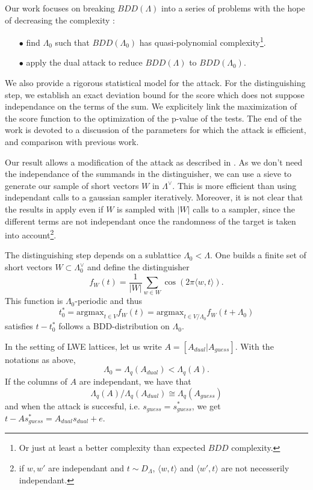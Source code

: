 \documentclass{article}
\begin{document}
Our work focuses on breaking $BDD(\Lambda)$ into a series of problems with the hope of decreasing the complexity :
\begin{itemize}
\item[$\bullet$] find $\Lambda_0$ such that $BDD(\Lambda_0)$ has quasi-polynomial complexity\footnote{Or just at least a better complexity than expected $BDD$ complexity.}.
\item[$\bullet$] apply the dual attack to reduce $BDD(\Lambda)$ to $BDD(\Lambda_0)$. 
\end{itemize} 

We also provide a rigorous statistical model for the attack. For the distinguishing step, we establish an exact deviation bound for the score which does not suppose independance on the terms of the sum. We explicitely link the maximization of the score function to the optimization of the p-value of the tests. The end of the work is devoted to a discussion of the parameters for which the attack is efficient, and comparison with previous work. 

Our result allows a modification of the attack as described in \cite{pouly2023provable}. As we don't need the independance of the summands in the distinguisher, we can use a sieve to generate our sample of short vectors $W$ in $\Lambda^\vee$. This is more efficient than using independant calls to a gaussian sampler iteratively. Moreover, it is not clear that the results in \cite{pouly2023provable} apply even if $W$ is sampled with $|W|$ calls to a sampler, since the different terms are not independant once the randomness of the target is taken into account\footnote{if $w,w'$ are independant and $t\sim D_\Lambda$, $\langle w , t \rangle $ and $\langle w' , t \rangle $ are not necesserily independant.}.   
 
The distinguishing step depends on a sublattice $\Lambda_0 < \Lambda$. One builds a finite set of short vectors $W\subset \Lambda_0^\vee$ and define the distinguisher
$$f_W(t) = \frac{1}{|W|} \sum_{w\in W} \cos (2\pi \langle w, t\rangle ).$$ 
This function is $\Lambda_0$-periodic and thus 
$$ t_0^* = \text{argmax}_{t\in V} f_W(t) = \text{argmax}_{t\in V/\Lambda_0} f_W(t+ \Lambda_0) $$
satisfies $t - t_0^*$ follows a BDD-distribution on $\Lambda_0$.

In the setting of LWE lattices, let us write $A  = [A_{dual} | A_{guess} ]$. With the notations as above, 
$$\Lambda_0 = \Lambda_{q}(A_{dual}) < \Lambda_q(A).$$ 
If the columns of $A$ are independant, we have that 
$$\Lambda_{q}(A) / \Lambda_{q}(A_{dual}) \cong \Lambda_{q}(A_{guess})$$ 
and when the attack is succesful, i.e. $s_{guess} = s_{guess}^*$, we get $t-As_{guess}^* = A_{dual}s_{dual} + e$.
\end{document}

